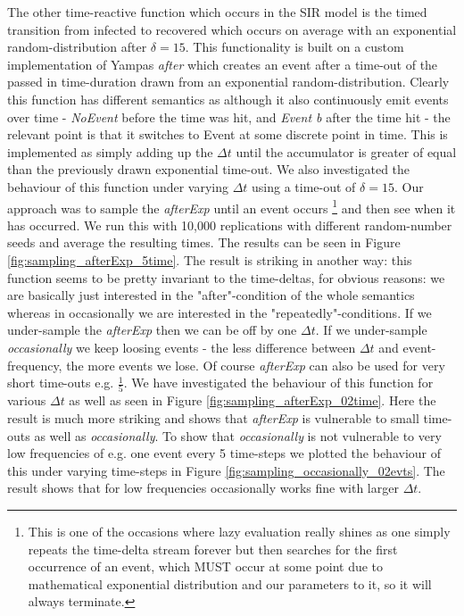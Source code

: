 The other time-reactive function which occurs in the SIR model is the timed transition from infected to recovered which occurs on average with an exponential random-distribution after $\delta = 15$. This functionality is built on a custom implementation of Yampas \textit{after} which creates an event after a time-out of the passed in time-duration drawn from an exponential random-distribution. Clearly this function has different semantics as although it also continuously emit events over time - \textit{NoEvent} before the time was hit, and \textit{Event b} after the time hit - the relevant point is that it switches to Event at some discrete point in time. This is implemented as simply adding up the $\Delta t$ until the accumulator is greater of equal than the previously drawn exponential time-out. We also investigated the behaviour of this function under varying $\Delta t$ using a time-out of $\delta = 15$. Our approach was to sample the \textit{afterExp} until an event occurs \footnote{This is one of the occasions where lazy evaluation really shines as one simply repeats the time-delta stream forever but then searches for the first occurrence of an event, which MUST occur at some point due to mathematical exponential distribution and our parameters to it, so it will always terminate.} and then see when it has occurred. We run this with 10,000 replications with different random-number seeds and average the resulting times. The results can be seen in Figure \ref{fig:sampling_afterExp_5time}. The result is striking in another way: this function seems to be pretty invariant to the time-deltas, for obvious reasons: we are basically just interested in the "after"-condition of the whole semantics whereas in occasionally we are interested in the "repeatedly"-conditions. If we under-sample the \textit{afterExp} then we can be off by one $\Delta t$. If we under-sample \textit{occasionally} we keep loosing events - the less difference between $\Delta t$ and event-frequency, the more events we lose. Of course \textit{afterExp} can also be used for very short time-outs e.g. $\frac{1}{5}$. We have investigated the behaviour of this function for various $\Delta t$ as well as seen in Figure \ref{fig:sampling_afterExp_02time}. Here the result is much more striking and shows that \textit{afterExp} is vulnerable to small time-outs as well as \textit{occasionally}.  
To show that \textit{occasionally} is not vulnerable to very low frequencies of e.g. one event every 5 time-steps we plotted the behaviour of this under varying time-steps in Figure \ref{fig:sampling_occasionally_02evts}. The result shows that for low frequencies occasionally works fine with larger $\Delta t$.

